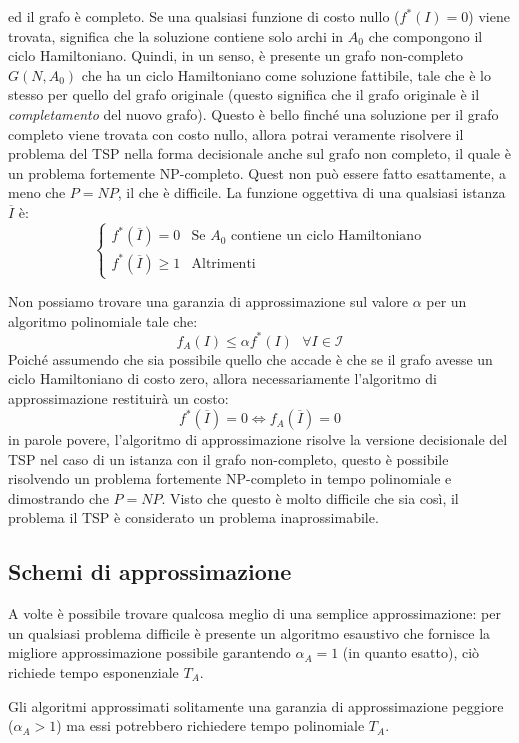 \documentclass{article}
\begin{document}
ed il grafo è completo. Se una qualsiasi funzione di costo nullo ($f^*(I)=0$) viene trovata, significa che la
soluzione contiene solo archi in $A_0$ che compongono il ciclo Hamiltoniano. Quindi, in un senso, è presente
un grafo non-completo $G(N,A_0)$ che ha un ciclo Hamiltoniano come soluzione fattibile, tale che è lo stesso
per quello del grafo originale (questo significa che il grafo originale è il \textit{completamento} del nuovo
grafo).
Questo è bello finché una soluzione per il grafo completo viene trovata con costo nullo, allora potrai
veramente risolvere il problema del TSP nella forma decisionale anche sul grafo non completo, il quale
è un problema fortemente NP-completo. Quest non può essere fatto esattamente, a meno che $P=NP$, il
che è difficile. La funzione oggettiva di una qualsiasi istanza $\overline{I}$ è:
\[\begin{cases}
        f^*(\overline{I})=0     & \text{Se }A_0\text{ contiene un ciclo Hamiltoniano} \\
        f^*(\overline{I})\geq 1 & \text{Altrimenti}
    \end{cases}
\]

Non possiamo trovare una garanzia di approssimazione sul valore $\alpha$ per un algoritmo
polinomiale tale che:
$$f_A(I)\leq\alpha f^*(I)\text{  }\forall I\in\mathcal{I}$$
Poiché assumendo che sia possibile quello che accade è che se il grafo avesse un ciclo Hamiltoniano
di costo zero, allora necessariamente l'algoritmo di approssimazione restituirà un costo:
$$f^*(\overline{I})=0\Leftrightarrow f_A(\overline{I})=0$$
in parole povere, l'algoritmo di approssimazione risolve la versione decisionale del TSP nel
caso di un istanza con il grafo non-completo, questo è possibile risolvendo un problema
fortemente NP-completo in tempo polinomiale e dimostrando che $P=NP$. Visto che questo è molto
difficile che sia così, il problema il TSP è considerato un problema inaprossimabile.

\subsection{Schemi di approssimazione}
A volte è possibile trovare qualcosa meglio di una semplice approssimazione: per un qualsiasi
problema difficile è presente un algoritmo esaustivo che fornisce la migliore approssimazione
possibile garantendo $\alpha_A=1$ (in quanto esatto), ciò richiede tempo esponenziale $T_A$.

Gli algoritmi approssimati solitamente una garanzia di approssimazione peggiore ($\alpha_A >1$)
ma essi potrebbero richiedere tempo polinomiale $T_A$.
\end{document}
